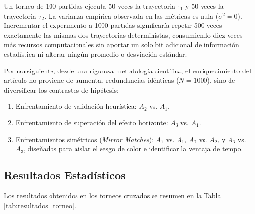\documentclass[10pt,a4paper]{article}
\begin{document}
Un torneo de 100 partidas ejecuta 50 veces la trayectoria $\tau_1$ y 50 veces la trayectoria $\tau_2$. La varianza empírica observada en las métricas es nula ($\sigma^2 = 0$). Incrementar el experimento a 1000 partidas significaría repetir 500 veces exactamente las mismas dos trayectorias deterministas, consumiendo diez veces más recursos computacionales sin aportar un solo bit adicional de información estadística ni alterar ningún promedio o desviación estándar. 

Por consiguiente, desde una rigurosa metodología científica, el enriquecimiento del artículo no proviene de aumentar redundancias idénticas ($N=1000$), sino de diversificar los contrastes de hipótesis:
\begin{enumerate}
    \item Enfrentamiento de validación heurística: $A_2$ vs. $A_1$.
    \item Enfrentamiento de superación del efecto horizonte: $A_3$ vs. $A_1$.
    \item Enfrentamientos simétricos (\textit{Mirror Matches}): $A_1$ vs. $A_1$, $A_2$ vs. $A_2$, y $A_3$ vs. $A_3$, diseñados para aislar el sesgo de color e identificar la ventaja de tempo.
\end{enumerate}

\subsection{Resultados Estadísticos}

Los resultados obtenidos en los torneos cruzados se resumen en la Tabla \ref{tab:resultados_torneo}.

\begin{table}[h]
    \centering
    \caption{Resultados de torneos directos entre agentes (100 partidas por emparejamiento)}
    \label{tab:resultados_torneo}
\end{table}
\end{document}
